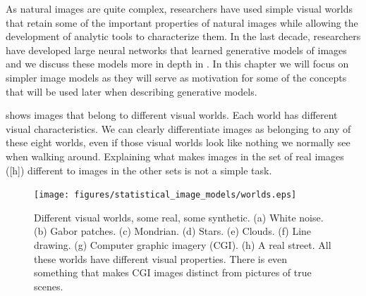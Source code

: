 As natural images are quite complex, researchers have used simple visual worlds that retain some of the important properties of natural images while allowing the development of analytic tools to characterize them. 
In the last decade, researchers have developed large neural networks that learned generative models of images
and we discuss these models more in depth in \chap{\ref{chapter:generative_models}}. In this chapter we will focus on simpler image models as they will serve as motivation for some of the concepts that will be used later when describing generative models. 


\Fig{\ref{fig:worlds}} shows images that belong to different visual worlds. Each world has different visual characteristics. We can clearly differentiate images as belonging to any of these eight worlds, even if those visual worlds look like nothing we normally see when walking around. Explaining what makes images in the set of real images (\fig{\ref{fig:worlds}}[h]) different to images in the other sets is not a simple task. 

\begin{figure}
\centerline{
\texttt{[image: figures/statistical\_image\_models/worlds.eps]}
} 
\caption{Different visual worlds, some real, some synthetic. (a) White noise. (b) Gabor patches. (c) Mondrian. (d) Stars. (e) Clouds. (f) Line drawing. (g) Computer graphic imagery (CGI). (h) A real street.  All these worlds have different visual properties. There is even something that makes CGI images distinct from pictures of true scenes.} 
\label{fig:worlds}
\end{figure}



